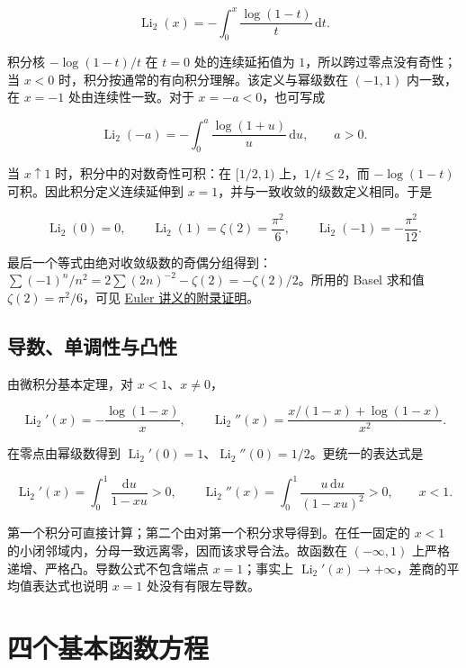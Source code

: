 \documentclass[11pt,a4paper]{article}
\begin{document}
\[
\operatorname{Li}_2(x)=-\int_0^x\frac{\log(1-t)}t\,\mathrm dt.
\]

积分核 \(-\log(1-t)/t\) 在 \(t=0\) 处的连续延拓值为 \(1\)，所以跨过零点没有奇性；当 \(x<0\) 时，积分按通常的有向积分理解。该定义与幂级数在 \((-1,1)\) 内一致，在 \(x=-1\) 处由连续性一致。对于 \(x=-a<0\)，也可写成

\[
\operatorname{Li}_2(-a)=-\int_0^a\frac{\log(1+u)}u\,\mathrm du,
\qquad a>0.
\]

当 \(x\uparrow1\) 时，积分中的对数奇性可积：在 \([1/2,1)\) 上，\(1/t\leqslant2\)，而 \(-\log(1-t)\) 可积。因此积分定义连续延伸到 \(x=1\)，并与一致收敛的级数定义相同。于是

\[
\operatorname{Li}_2(0)=0,\qquad
\operatorname{Li}_2(1)=\zeta(2)=\frac{\pi^2}{6},\qquad
\operatorname{Li}_2(-1)=-\frac{\pi^2}{12}.
\]

最后一个等式由绝对收敛级数的奇偶分组得到：\(\sum(-1)^n/n^2=2\sum(2n)^{-2}-\zeta(2)=-\zeta(2)/2\)。所用的 Basel 求和值 \(\zeta(2)=\pi^2/6\)，可见 \href{https://vincent-arqain.github.io/math-notes/notes/890e1516e64e21a2fb2248b4/\#计算二次特殊值}{Euler 讲义的附录证明}。

\hypertarget{ux5bfcux6570ux5355ux8c03ux6027ux4e0eux51f8ux6027}{%
\subsection{导数、单调性与凸性}\label{ux5bfcux6570ux5355ux8c03ux6027ux4e0eux51f8ux6027}}

由微积分基本定理，对 \(x<1\)、\(x\ne0\)，

\[
\operatorname{Li}_2'(x)=-\frac{\log(1-x)}x,
\qquad
\operatorname{Li}_2''(x)=\frac{x/(1-x)+\log(1-x)}{x^2}.
\]

在零点由幂级数得到 \(\operatorname{Li}_2'(0)=1\)、\(\operatorname{Li}_2''(0)=1/2\)。更统一的表达式是

\[
\operatorname{Li}_2'(x)=\int_0^1\frac{\mathrm du}{1-xu}>0,
\qquad
\operatorname{Li}_2''(x)=\int_0^1\frac{u\,\mathrm du}{(1-xu)^2}>0,
\qquad x<1.
\]

第一个积分可直接计算；第二个由对第一个积分求导得到。在任一固定的 \(x<1\) 的小闭邻域内，分母一致远离零，因而该求导合法。故函数在 \((-\infty,1)\) 上严格递增、严格凸。导数公式不包含端点 \(x=1\)；事实上 \(\operatorname{Li}_2'(x)\to+\infty\)，差商的平均值表达式也说明 \(x=1\) 处没有有限左导数。

\hypertarget{ux56dbux4e2aux57faux672cux51fdux6570ux65b9ux7a0b}{%
\section{四个基本函数方程}\label{ux56dbux4e2aux57faux672cux51fdux6570ux65b9ux7a0b}}
\end{document}
